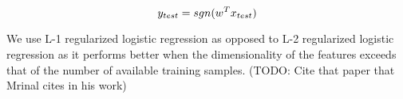 \[
y_{test} = sgn(w^Tx_{test})\\
\]

We use L-1 regularized logistic regression as opposed to L-2 regularized logistic regression as it performs better when the dimensionality of the features exceeds that of the number of available training samples. (TODO: Cite that paper that Mrinal cites in his work)
% 
% 
